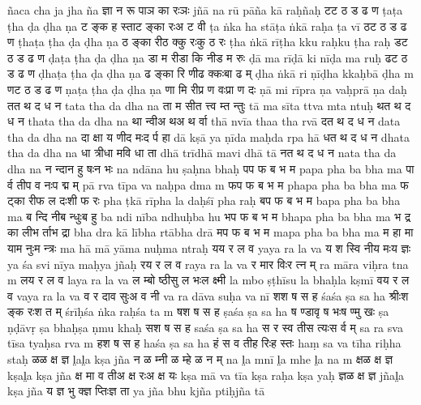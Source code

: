\documentclass{article}
\begin{document}
{ña}{ca cha ja jha ña}
{{ज्ञा न रू पा}{ञ का रः}{ञः}}%
{{jñā na rū pā}{ña kā raḥ}{ñaḥ}}
\card
{ट}{ट ठ ड ढ ण}%
{ṭa}{ṭa ṭha ḍa ḍha ṇa}
{{ट ङ्क ह स्ता}{ट ङ्का रः}{अ ट वी}}%
{{ṭa ṅka ha stā}{ṭa ṅkā raḥ}{a ṭa vī}}
\card
{ठ}{ट ठ ड ढ ण}%
{ṭha}{ṭa ṭha ḍa ḍha ṇa}
{{ठ ङ्का री}{ठ क्कु रः}{कु ठ रः}}%
{{ṭha ṅkā rī}{ṭha kku raḥ}{ku ṭha raḥ}}
\card
{ड}{ट ठ ड ढ ण}%
{ḍa}{ṭa ṭha ḍa ḍha ṇa}
{{डा म री}{डा कि नी}{ड म रुः}}%
{{ḍā ma rī}{ḍā ki nī}{ḍa ma ruḥ}}
\card
{ढ}{ट ठ ड ढ ण}%
{ḍha}{ṭa ṭha ḍa ḍha ṇa}
{{ढ ङ्का रि णी}{ढ क्कः}{बा ढ म्}}%
{{ḍha ṅkā ri ṇī}{ḍha kkaḥ}{bā ḍha m}}
\card
{ण}{ट ठ ड ढ ण}%
{ṇa}{ṭa ṭha ḍa ḍha ṇa}
{{णा मि री}{प्र ण वः}{प्रा ण दः}}%
{{ṇā mi rī}{pra ṇa vaḥ}{prā ṇa daḥ}}
\card
{त}{त थ द ध न}%
{ta}{ta tha da dha na}
{{ता म सी}{त त्त्व म्}{त न्तुः}}%
{{tā ma sī}{ta ttva m}{ta ntuḥ}}
\card
{थ}{त थ द ध न}%
{tha}{ta tha da dha na}
{{था न्वी}{अ थ}{अ थ र्वा}}%
{{thā nvī}{a tha}{a tha rvā}}
\card
{द}{त थ द ध न}%
{da}{ta tha da dha na}
{{दा क्षा य णी}{द मः}{द र्प हा}}%
{{dā kṣā ya ṇī}{da maḥ}{da rpa hā}}
\card
{ध}{त थ द ध न}%
{dha}{ta tha da dha na}
{{धा त्री}{धा म}{वि धा ता}}%
{{dhā trī}{dhā ma}{vi dhā tā}}
\card
{न}{त थ द ध न}%
{na}{ta tha da dha na}
{{न न्दा}{न हु षः}{न भः}}%
{{na ndā}{na hu ṣaḥ}{na bhaḥ}}
\card
{प}{प फ ब भ म}%
{pa}{pa pha ba bha ma}
{{पा र्व ती}{प व नः}{प द्म म्}}%
{{pā rva tī}{pa va naḥ}{pa dma m}}
\card
{फ}{प फ ब भ म}%
{pha}{pa pha ba bha ma}
{{फ ट्का री}{फ ल दः}{शी फ रः}}%
{{pha ṭkā rī}{pha la daḥ}{śī pha raḥ}}
\card
{ब}{प फ ब भ म}%
{ba}{pa pha ba bha ma}
{{ब न्दि नी}{ब न्धुः}{ब हु}}%
{{ba ndi nī}{ba ndhuḥ}{ba hu}}
\card
{भ}{प फ ब भ म}%
{bha}{pa pha ba bha ma}
{{भ द्र का ली}{भ र्ता}{भ द्रा}}%
{{bha dra kā lī}{bha rtā}{bha drā}}
\card
{म}{प फ ब भ म}%
{ma}{pa pha ba bha ma}
{{म हा मा या}{म नुः}{म न्त्रः}}%
{{ma hā mā yā}{ma nuḥ}{ma ntraḥ}}
\card
{य}{य र ल व}%
{ya}{ya ra la va}
{{य श स्वि नी}{य मः}{य ज्ञः}}%
{{ya śa svi nī}{ya maḥ}{ya jñaḥ}}
\card
{र}{य र ल व}%
{ra}{ya ra la va}
{{र मा}{र विः}{र त्न म्}}%
{{ra mā}{ra viḥ}{ra tna m}}
\card
{ल}{य र ल व}%
{la}{ya ra la va}
{{ल म्बो ष्ठी}{सु ल भः}{ल क्ष्मी}}%
{{la mbo ṣṭhī}{su la bhaḥ}{la kṣmī}}
\card
{व}{य र ल व}%
{va}{ya ra la va}
{{व र दा}{व सुः}{अ व नी}}%
{{va ra dā}{va suḥ}{a va nī}}
\card
{श}{श ष स ह}%
{śa}{śa ṣa sa ha}
{{श्रीः}{श ङ्क रः}{श त म्}}%
{{śrīḥ}{śa ṅka raḥ}{śa ta m}}
\card
{ष}{श ष स ह}%
{ṣa}{śa ṣa sa ha}
{{ष ण्डा}{वृ ष भः}{ष ण्मु खः}}%
{{ṣa ṇḍā}{vṛ ṣa bhaḥ}{ṣa ṇmu khaḥ}}
\card
{स}{श ष स ह}%
{sa}{śa ṣa sa ha}
{{स र स्व ती}{स त्यः}{स र्व म्}}%
{{sa ra sva tī}{sa tyaḥ}{sa rva m}}
\card
{ह}{श ष स ह}%
{ha}{śa ṣa sa ha}
{{हं स व ती}{ह रिः}{ह स्तः}}%
{{haṃ sa va tī}{ha riḥ}{ha staḥ}}
\card
{ळ}{ळ क्ष ज्ञ}%
{l̤a}{l̤a kṣa jña}
{{न ळ म्}{नी ळ म्}{हे ळ न म्}}%
{{na l̤a m}{nī l̤a m}{he l̤a na m}}
\card
{क्ष}{ळ क्ष ज्ञ}%
{kṣa}{l̤a kṣa jña}
{{क्ष मा व ती}{अ क्ष रः}{अ क्ष यः}}%
{{kṣa mā va tī}{a kṣa raḥ}{a kṣa yaḥ}}
\card
{ज्ञ}{ळ क्ष ज्ञ}%
{jña}{l̤a kṣa jña}
{{य ज्ञ भु क्}{ज्ञ प्तिः}{ज्ञ ता}}%
{{ya jña bhu k}{jña ptiḥ}{jña tā}}
\end{document}
